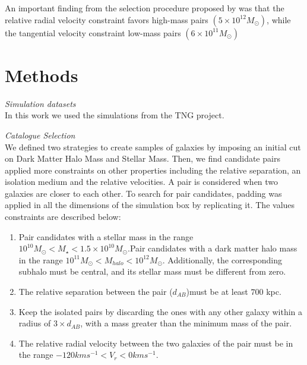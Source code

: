 \documentclass[fleqn,usenatbib]{mnras}
\begin{document}
An important finding from the selection procedure proposed by \cite{fattahi2016apostle} was that the relative radial velocity constraint favors high-mass pairs $(5\times 10^{12} M_\odot)$, while the tangential velocity constraint low-mass pairs $(6\times 10^{11} M_\odot)$






\section{Methods}
\textit{Simulation datasets}\\
In this work we used the simulations from the TNG project.


\textit{Catalogue Selection}\\
We defined two strategies to create samples of galaxies by imposing an initial cut on Dark Matter Halo Mass and Stellar Mass. %
Then, we find candidate pairs applied more constraints on other properties including the relative separation, an isolation medium and the relative velocities. A pair is considered when two galaxies are closer to each other. To search for pair candidates, padding was applied in all the dimensions of the simulation box by replicating it. The values constraints are described below:
\begin{enumerate}[i]
  \item Pair candidates with a stellar mass in the range $10^{10}M_\odot <M_\star<1.5\times 10^{10}M_\odot$.Pair candidates with a dark matter halo mass in the range $10^{11}M_\odot<M_{halo}<10^{12}M_\odot$. Additionally, the corresponding subhalo must be central, and its stellar mass must be different from zero. 
  \item The relative separation between the pair ($d_{AB}$)must be at least $700$ kpc. 
  \item Keep the isolated pairs by discarding the ones with any other galaxy within a radius of $3\times d_{AB}$, with a mass greater than the minimum mass of the pair. 
  \item The relative radial velocity between the two galaxies of the pair must be in the range $-120 km s^{-1}<V_r<0 km s^{-1}$. 
\end{enumerate}
\end{document}
